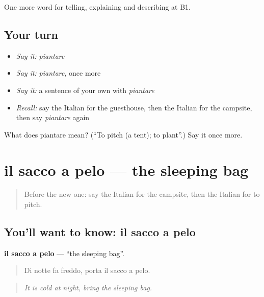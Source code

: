 \begin{grammarlens}[title={What you've built}]
One more word for telling, explaining and describing at B1.
\end{grammarlens}

\subsection*{Your turn}
\begin{itemize}
\raggedright
  \item \emph{Say it:} \emph{piantare}
  \item \emph{Say it:} \emph{piantare}, once more
  \item \emph{Say it:} a sentence of your own with \emph{piantare}
  \item \emph{Recall:} say the Italian for the guesthouse, then the Italian for the campsite, then say \emph{piantare} again
\end{itemize}

\begin{tcolorbox}[breakable,colback=teal!4,colframe=teal!35!black,title={Before you move on}]
What does piantare mean? (\textquotedblleft{}To pitch (a tent); to plant\textquotedblright{}.) Say it once more.
\end{tcolorbox}
\section[il sacco a pelo]{il sacco a pelo — the sleeping bag}

\label{lesson:IT-C430-sacco-a-pelo}



\begin{quote}
Before the new one: say the Italian for the campsite, then the Italian for to pitch.
\end{quote}

\subsection*{You'll want to know: il sacco a pelo}
\textbf{il sacco a pelo} — \textquotedblleft{}the sleeping bag\textquotedblright{}.

\begin{quote}
Di notte fa freddo, porta il sacco a pelo.
\end{quote}

\begin{quote}
\emph{It is cold at night, bring the sleeping bag.}
\end{quote}

